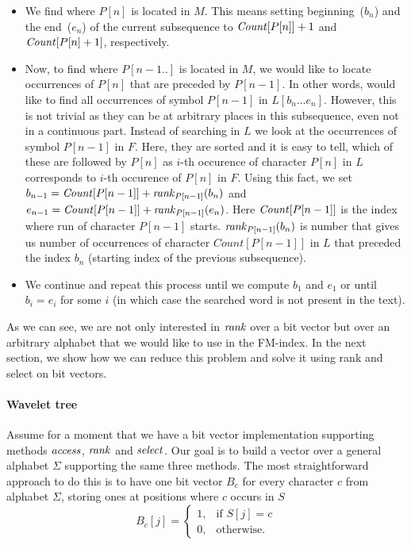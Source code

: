 \begin{itemize}
	\item We find where $P[n]$ is located in $M$. This means setting beginning~($b_{n}$) and
	the end~($e_{n}$) of the current subsequence to $\mathit{Count}[P[n]]+1$ and $\mathit{Count}[P[n]+1]$,
	respectively.
	\item Now, to find where $P[n-1..]$ is located in $M$, we would like to locate occurrences
	of $P[n]$ that are preceded by $P[n-1]$. In other words, would like to find all
	occurrences of symbol $P[n-1]$ in $L[b_{n}\ldots e_{n}]$. However, this is not trivial
	as they can be at arbitrary places in this subsequence, even not in a continuous
	part. Instead of searching in $L$ we look at the occurrences of symbol $P[n-1]$ in
	$F$. Here, they are sorted and it is easy to tell, which of these are followed by
	$P[n]$ as $i$-th occurence of character $P[n]$ in $L$ corresponds to $i$-th
	occurence of $P[n]$ in $F$. Using this fact, we set
	$b_{n-1} = \mathit{Count}[P[n-1]] + \mathit{rank}_{P[n-1]}(b_{n})$ and
	$e_{n-1} = \mathit{Count}[P[n-1]] + \mathit{rank}_{P[n-1]}(e_{n})$. Here $\mathit{Count}[P[n-1]]$
	is the index where run of character $P[n-1]$ starts. $\mathit{rank}_{P[n-1]}(b_{n})$
	is number that gives us number of occurrences of character $Count[P[n-1]]$ in $L$ that
	preceded the index $b_{n}$ (starting index of the previous subsequence).
	\item We continue and repeat this process until we compute $b_1$ and $e_1$ or until
	$b_i=e_i$ for some $i$ (in which case the searched word is not present in the text).
\end{itemize}

As we can see, we are not only interested in $\mathit{rank}$ over a bit vector but over an arbitrary
alphabet that we would like to use in the FM-index. In the next section, we show how we can
reduce this problem and solve it using rank and select on bit vectors.

\paragraph{Wavelet tree}
\label{section:WaweletTree}

Assume for a moment that we have a bit vector implementation supporting methods $\mathit{access}$,
$\mathit{rank}$ and $\mathit{select}$. Our goal is to build a vector over a general alphabet $\Sigma$
supporting the same three methods. The most straightforward approach to do this is to
have one bit vector $B_c$ for every character $c$ from alphabet $\Sigma$, storing ones at
positions where $c$ occurs in $S$
\[
    B_c[j]= 
\begin{cases}
	1,& \text{if } S[j]=c \\
    0,& \text{otherwise.}
\end{cases}
\]

